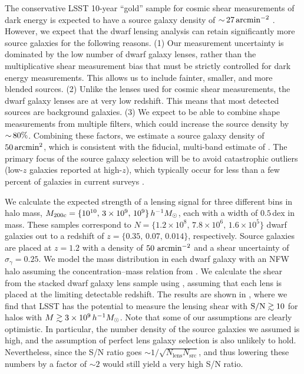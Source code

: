 The conservative LSST 10-year ``gold'' sample for cosmic shear measurements of dark energy is expected to have a source galaxy density of $ {\sim}\, 27 \mathrm{\,arcmin}^{-2}$ \citep{Chang:2013,1809.01669}. 
However, we expect that the dwarf lensing analysis can retain significantly more source galaxies for the following reasons.
(1) Our measurement uncertainty is dominated by the low number of dwarf galaxy lenses, rather than the  multiplicative shear measurement bias that must be strictly controlled for dark energy measurements. This allows us to include fainter, smaller, and more blended sources.
(2) Unlike the lenses used for cosmic shear measurements, the dwarf galaxy lenses are at very low redshift. This means that most detected sources are background galaxies.
(3) We expect to be able to combine shape measurements from multiple filters, which could increase the source density by $ {\sim}\, 80\%$. 
Combining these factors, we estimate a source galaxy density of $50 \mathrm{\,arcmin}^2$, which is consistent with the fiducial, multi-band estimate of \citet{Chang:2013}.
The primary focus of the source galaxy selection will be to avoid catastrophic \photoz outliers (low-$z$ galaxies reported at high-$z$), which typically occur for less than a few percent of galaxies in current surveys \citep{1406.4407}. 

\vspace{1em} 

We calculate the expected strength of a lensing signal for three different bins in halo mass,  $M_{200c} = \{10^{10},\, 3\times10^9,\, 10^{9}\}\,h^{-1}M_\odot$, each with a width of $0.5$\,dex in mass. 
These samples correspond to $N = \{1.2\times10^8,\, 7.8\times10^6,\, 1.6\times10^5\}$ dwarf galaxies out to a redshift of $z = \{0.35,\, 0.07,\, 0.014\}$, respectively.
Source galaxies are placed at $z = 1.2$ with a density of $50 \hbox{ arcmin}^{-2}$ and a shear uncertainty of $\sigma_\gamma = 0.25$.
We model the mass distribution in each dwarf galaxy with an NFW halo assuming the concentration--mass relation from \citet{1809.07326}.
We calculate the shear from the stacked dwarf galaxy lens sample using  \citep{2018ApJS..239...35D}, assuming that each lens is placed at the limiting detectable redshift.
The results are shown in , where we find that LSST has the potential to measure the lensing shear with ${\rm S/N} \gtrsim 10$ for halos with $M \gtrsim 3 \times 10^9\,h^{-1}M_\odot$.
Note that some of our assumptions are clearly optimistic. In particular, the number density of the source galaxies we assumed is high, and the assumption of perfect lens galaxy selection is also unlikely to hold. Nevertheless, since the S/N ratio goes $\sim 1/\sqrt{N_\text{lens} N_\text{src}}$, and thus lowering these numbers by a factor of $\sim 2$ would still yield a very high S/N ratio.

